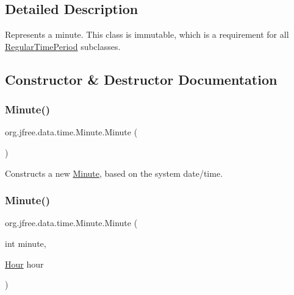 \subsection{Detailed Description}
Represents a minute. This class is immutable, which is a requirement for all \mbox{\hyperlink{classorg_1_1jfree_1_1data_1_1time_1_1_regular_time_period}{Regular\+Time\+Period}} subclasses. 

\subsection{Constructor \& Destructor Documentation}
\mbox{\label{classorg_1_1jfree_1_1data_1_1time_1_1_minute_a11b025b5d3af255dcdba43be2cfe2a87}} 
\subsubsection{\texorpdfstring{Minute()}{Minute()}\hspace{0.1cm}{\footnotesize\ttfamily [1/6]}}
{\footnotesize\ttfamily org.\+jfree.\+data.\+time.\+Minute.\+Minute (\begin{DoxyParamCaption}{ }\end{DoxyParamCaption})}

Constructs a new \mbox{\hyperlink{classorg_1_1jfree_1_1data_1_1time_1_1_minute}{Minute}}, based on the system date/time. \mbox{\label{classorg_1_1jfree_1_1data_1_1time_1_1_minute_aa71e3e4cd7f02dba347cff5301a5e262}} 
\subsubsection{\texorpdfstring{Minute()}{Minute()}\hspace{0.1cm}{\footnotesize\ttfamily [2/6]}}
{\footnotesize\ttfamily org.\+jfree.\+data.\+time.\+Minute.\+Minute (\begin{DoxyParamCaption}\item[{int}]{minute,  }\item[{\mbox{\hyperlink{classorg_1_1jfree_1_1data_1_1time_1_1_hour}{Hour}}}]{hour }\end{DoxyParamCaption})}

